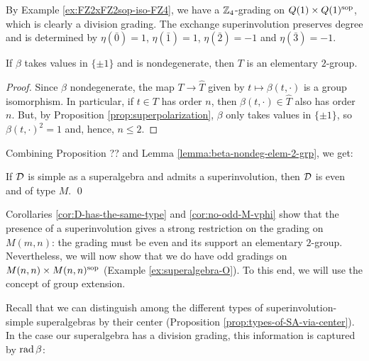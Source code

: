 \begin{ex}\label{ex:FZ4-revisited}
	By Example \ref{ex:FZ2xFZ2sop-iso-FZ4}, we have a $\mathbb{Z}_4$-grading on $Q(1)\times Q(1)^{\mathrm{sop}}$, which is clearly a division grading.
	The exchange superinvolution preserves degree and is determined by $\eta (\bar 0) = 1$, $\eta (\bar 1) = 1$, $\eta (\bar 2) = -1$ and $\eta (\bar 3) = -1$.
\end{ex}

\begin{lemma}\label{lemma:beta-nondeg-elem-2-grp}
	If $\beta$ takes values in $\{ \pm 1 \}$ and is nondegenerate, then $T$ is an elementary $2$-group.
\end{lemma}

\begin{proof}
	Since $\beta$ nondegenerate, the map $T \to \widehat T$ given by $t \mapsto \beta(t, \cdot)$ is a group isomorphism.
	In particular, if $t\in T$ has order $n$, then $\beta(t, \cdot)\in \widehat T$ also has order $n$.
	But, by Proposition \ref{prop:superpolarization}, $\beta$ only takes values in $\{ \pm 1\}$, so  $\beta(t, \cdot )^2 =1$ and, hence, $ n \leq 2$.
\end{proof}

Combining Proposition ??  %
and Lemma \ref{lemma:beta-nondeg-elem-2-grp}, we get:

\begin{cor}\label{cor:no-odd-M-vphi}
	If $\mathcal{D}$ is simple as a superalgebra and admits a superinvolution, then $\mathcal{D}$ is even and of type $M$. \qed
\end{cor}


Corollaries \ref{cor:D-has-the-same-type} and \ref{cor:no-odd-M-vphi} show that the presence of a superinvolution gives a strong restriction on the grading on $M(m,n)$: the grading must be even and its support an elementary $2$-group.
Nevertheless, we will now show that we do have odd gradings on $M(n,n)\times M(n,n)^{\mathrm{sop}}$ (Example \ref{ex:superalgebra-O}).
To this end, we will use the concept of group extension.

Recall that we can distinguish among the different types of superinvolution-simple superalgebras by their center (Proposition \ref{prop:types-of-SA-via-center}).
In the case our superalgebra has a division grading, this information is captured by $\operatorname{rad} \beta$:

